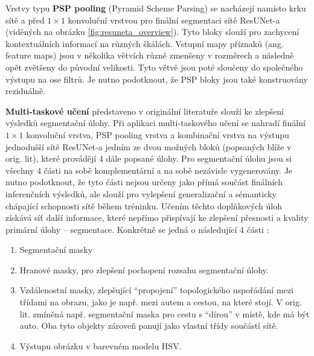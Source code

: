 Vrstvy typu \textbf{PSP pooling} (Pyramid Scheme Parsing) se nacházejí namísto krku sítě a před $1\times1$ konvoluční vrstvou pro finální segmentaci sítě ResUNet-a (viděných na obrázku \ref{fig:resuneta_overview}). Tyto bloky slouží pro zachycení kontextuálních informací na různých škálách. Vstupní mapy příznaků (ang. feature maps) jsou v několika větvích různě zmenšeny v rozměrech a následně opět zvětšeny do původní velikosti. Tyto větvě jsou poté sloučeny do společného výstupu na ose filtrů. Je nutno podotknout, že PSP bloky jsou také konstruovány reziduálně.

\textbf{Multi-taskové učení} představeno v originální literatuře slouží ke zlepšení výsledků segmentační úlohy. Při aplikaci multi-taskového učení se nahradí finální $1\times1$ konvoluční vrstva, PSP pooling vrstva a kombinační vrstva na výstupu jednodušší sítě ResUNet-a jedním ze dvou možných bloků (popsaných blíže v orig. lit), které provádějí 4 dále popsané úlohy. Pro segmentační úlohu jsou si všechny 4 části na sobě komplementární a na sobě nezávisle vygenerovány. Je nutno podotknout, že tyto části nejsou určeny jako přímá součást finálních inferenčních výsledků, ale slouží pro vylepšení generalizační a sémanticky chápající schopnosti sítě během tréninku. Učením těchto doplňkových úloh získává síť další informace, které nepřímo přispívají ke zlepšení přesnosti a kvality primární úlohy -- segmentace. Konkrétně se jedná o následující 4 části \cite{resuneta}: 
\begin{enumerate}
    \item Segmentační masky
    \item Hranové masky, pro zlepšení pochopení rozsahu segmentační úlohy.
    \item Vzdálenostní masky, zlepšující \enquote{propojení} topologického uspořádání mezi třídami na obrazu, jako je např. mezi autem a cestou, na které stojí. V orig. lit. zmíněná např. segmentační maska pro cestu s \enquote{dírou} v místě, kde má být auto. Oba tyto objekty zároveň panují jako vlastní třídy součástí sítě.
    \item Výstupu obrázku v barevném modelu HSV.
\end{enumerate}
\endinput